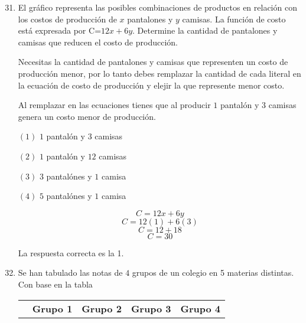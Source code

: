 \documentclass[11pt, a4paper]{article} %
\theoremstyle{dotlessP}
\theoremstyle{dotlessS}
\begin{document}
\thispagestyle{empty}




\begin{enumerate}[label=\color{dg}\theenumi.]
        \setcounter{enumi}{30}
        \item {\color{db}
        El gráfico representa las posibles combinaciones de productos en relación con los costos de producción de \(x\) pantalones y \(y\) camisas. La función de costo está expresada por C=\(12x+6y\). Determine la cantidad de pantalones y camisas que reducen el costo de producción.}
        
        
        Necesitas la cantidad de pantalones y camisas que representen un costo de producción menor, por lo tanto debes remplazar la cantidad de cada literal en la ecuación de costo de producción y elejir la que represente menor costo.
        
        Al remplazar en las ecuaciones tienes que al producir \(1\) pantalón y \(3\) camisas genera un costo menor de producción.
        
        {\color{dh} \((1)\) \(1\) pantalón y \(3\) camisas
        
        \((2)\) \(1\) pantalón y \(12\) camisas
        
        \((3)\) \(3\) pantalónes y \(1\) camisa
        
        \((4)\) \(5\) pantalónes y \(1\) camisa}
        

        
       \[ C= 12x + 6y\]
         \[ C= 12(1) + 6(3)\]
         \[ C= 12 + 18\]
         \[ C=30\]
        
 {\color{dh}La respuesta correcta es la 1.}

		\item {\color{db}
        Se han tabulado las notas de \(4\) grupos de un colegio en 5 materias distintas. Con base en la tabla }
        
        
        \begin{table}[htbp]
		\centering
		\label{my-label}
	\begin{tabular}{|c|c|c|c|c|}
		\hline
		\textbf{       } & \textbf{Grupo 1} & 					\textbf{Grupo 2} & \textbf{Grupo 3} & \textbf{Grupo 4}
        

\end{tabular}
\end{table}
\end{enumerate}
\end{document}
